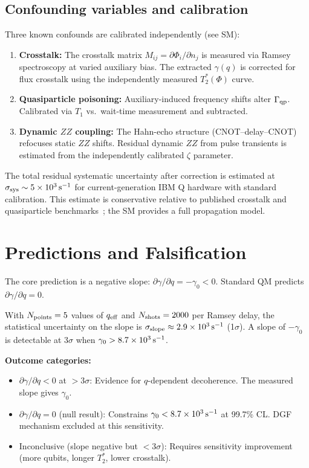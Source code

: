 \documentclass[aps,prl,twocolumn,superscriptaddress,hyperref]{revtex4-2}
\begin{document}
\subsection{Confounding variables and calibration}

Three known confounds are calibrated independently (see SM):

\begin{enumerate}
    \item \textbf{Crosstalk:} The crosstalk matrix $M_{ij} = \partial\Phi_i/\partial n_j$ is measured via Ramsey spectroscopy at varied auxiliary bias. The extracted $\gamma(q)$ is corrected for flux crosstalk using the independently measured $T_2^*(\Phi)$ curve.
    \item \textbf{Quasiparticle poisoning:} Auxiliary-induced frequency shifts alter $\Gamma_{\rm qp}$. Calibrated via $T_1$ vs.\ wait-time measurement and subtracted.
    \item \textbf{Dynamic $ZZ$ coupling:} The Hahn-echo structure (CNOT--delay--CNOT) refocuses static $ZZ$ shifts. Residual dynamic $ZZ$ from pulse transients is estimated from the independently calibrated $\zeta$ parameter.
\end{enumerate}

The total residual systematic uncertainty after correction is estimated at $\sigma_{\rm sys} \sim 5 \times 10^3\,{\rm s}^{-1}$ for current-generation IBM Q hardware with standard calibration. This estimate is conservative relative to published crosstalk and quasiparticle benchmarks~\cite{Krantz:2019}; the SM provides a full propagation model.

\section{Predictions and Falsification}

The core prediction is a negative slope: $\partial\gamma/\partial q = -\gamma_0 < 0$. Standard QM predicts $\partial\gamma/\partial q = 0$.

With $N_{\rm points}=5$ values of $q_{\rm eff}$ and $N_{\rm shots}=2000$ per Ramsey delay, the statistical uncertainty on the slope is $\sigma_{\rm slope} \approx 2.9 \times 10^3\,{\rm s}^{-1}$ (1$\sigma$). A slope of $-\gamma_0$ is detectable at $3\sigma$ when $\gamma_0 > 8.7 \times 10^3\,{\rm s}^{-1}$.

\textbf{Outcome categories:}
\begin{itemize}
    \item $\partial\gamma/\partial q < 0$ at $>3\sigma$: Evidence for $q$-dependent decoherence. The measured slope gives $\gamma_0$.
    \item $\partial\gamma/\partial q = 0$ (null result): Constrains $\gamma_0 < 8.7 \times 10^3\,{\rm s}^{-1}$ at 99.7\% CL. DGF mechanism excluded at this sensitivity.
    \item Inconclusive (slope negative but $<3\sigma$): Requires sensitivity improvement (more qubits, longer $T_2^*$, lower crosstalk).
\end{itemize}
\end{document}

